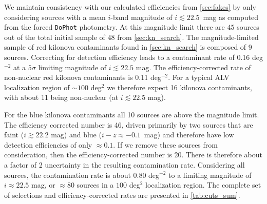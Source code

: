 We maintain consistency with our calculated efficiencies from \autoref{sec:fakes} by only considering sources with a mean $i$-band magnitude of $i \lesssim 22.5$~mag as computed from the forced {\tt DoPhot} photometry. At this magnitude limit there are $45$ sources out of the total initial sample of $48$ from \autoref{sec:kn_search}. The magnitude-limited sample of red kilonova contaminants found in \autoref{sec:kn_search} is composed of 9 sources. Correcting for detection efficiency leads to a contaminant rate of 0.16 deg$^{-2}$ at a $5\sigma$ limiting magnitude of $i \lesssim 22.5$ mag. The efficiency-corrected rate of non-nuclear red kilonova contaminants is 0.11 deg$^{-2}$.  For a typical ALV localization region of $\sim 100$ deg$^2$ we therefore expect 16 kilonova contaminants, with about 11 being non-nuclear (at $i\lesssim 22.5$ mag).

For the blue kilonova contaminants all 10 sources are above the magnitude limit. The efficiency corrected number is 46, driven primarily by two sources that are faint ($i \gtrsim 22.2$ mag) and blue ($i-z \approx -0.1$~mag) and therefore have low detection efficiencies of only $\approx 0.1$. If we remove these sources from consideration, then the efficiency-corrected number is 20. There is therefore about a factor of 2 uncertainty in the resulting contamination rate. Considering all sources, the contamination rate is about 0.80 deg$^{-2}$ to a limiting magnitude of $i\approx 22.5$ mag, or $\approx 80$ sources in a $100$ deg$^2$ localization region. The complete set of selections and efficiency-corrected rates are presented in \autoref{tab:cuts_sum}.

